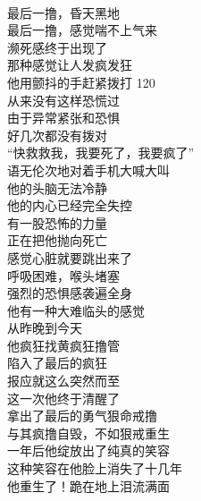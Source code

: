 \begin{poem}[从疯撸到狠戒]
    \begin{multicols}{2}
        \centering~\\
        最后一撸，昏天黑地 \\ 最后一撸，感觉喘不上气来 \\ 濒死感终于出现了 \\ 那种感觉让人发疯发狂 \\ 他用颤抖的手赶紧拨打 120 \\ 从来没有这样恐慌过 \\ 由于异常紧张和恐惧 \\ 好几次都没有拨对 \\ “快救救我，我要死了，我要疯了” \\ 语无伦次地对着手机大喊大叫 \\ 他的头脑无法冷静 \\ 他的内心已经完全失控 \\ 有一股恐怖的力量 \\ 正在把他抛向死亡 \\ 感觉心脏就要跳出来了 \\ 呼吸困难，喉头堵塞 \\ 强烈的恐惧感袭遍全身 \\ 他有一种大难临头的感觉 \\ 从昨晚到今天 \\ 他疯狂找黄疯狂撸管 \\ 陷入了最后的疯狂 \\ 报应就这么突然而至 \\ 这一次他终于清醒了 \\ 拿出了最后的勇气狠命戒撸 \\ 与其疯撸自毁，不如狠戒重生 \\ 一年后他绽放出了纯真的笑容 \\ 这种笑容在他脸上消失了十几年 \\ 他重生了！跪在地上泪流满面
    \end{multicols}
\end{poem}


